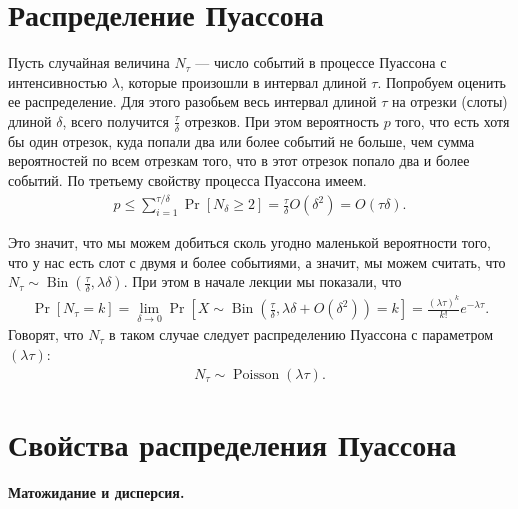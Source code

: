 \documentclass[12pt]{article}
\DeclareMathOperator{\Bin}{Bin}
\DeclareMathOperator{\Pois}{Poisson}
\begin{document}
\section{Распределение Пуассона}
Пусть случайная величина $N_\tau$ --- число событий в процессе Пуассона с интенсивностью $\lambda$, которые произошли в интервал длиной $\tau$. Попробуем оценить ее распределение. Для этого разобьем весь интервал длиной $\tau$ на отрезки (слоты) длиной $\delta$, всего получится $\frac\tau\delta$ отрезков. При этом вероятность $p$ того, что есть хотя бы один отрезок, куда попали два или более событий не больше, чем сумма вероятностей по всем отрезкам того, что в этот отрезок попало два и более событий. По третьему свойству процесса Пуассона имеем.
\begin{align*}
  p \le \sum_{i = 1}^{\tau/\delta} \Pr[N_\delta \ge 2] = \frac{\tau}{\delta} O(\delta^2) = O(\tau \delta).
\end{align*}

Это значит, что мы можем добиться сколь угодно маленькой вероятности того, что у нас есть слот с двумя и более событиями, а значит, мы можем считать, что $N_\tau \sim \Bin(\frac{\tau}{\delta}, \lambda\delta)$. При этом в начале лекции мы показали, что
\begin{align*}
  \Pr[N_\tau = k] = \lim_{\delta \to 0} \Pr[X \sim \Bin(\frac{\tau}{\delta}, \lambda\delta + O(\delta^2)) = k] = \frac{(\lambda\tau)^k}{k!}e^{-\lambda\tau}.
\end{align*}
Говорят, что $N_\tau$ в таком случае следует распределению Пуассона с параметром $(\lambda\tau)$:
\begin{align*}
  N_\tau \sim \Pois(\lambda\tau).
\end{align*}

\section{Свойства распределения Пуассона}
\textbf{Матожидание и дисперсия.}
\end{document}
